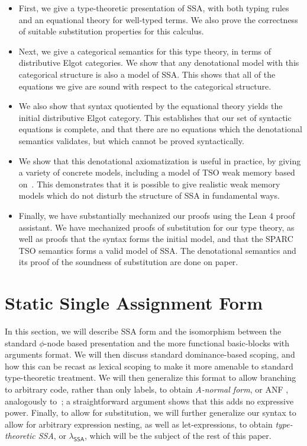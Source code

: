 \documentclass[acmsmall,screen,review]{acmart}
\newcommand{\ms}[1]{\ensuremath{\mathsf{#1}}}
\newcommand{\isotopessa}{\(\lambda_{\ms{SSA}}\)}
\begin{document}
\begin{itemize}
\item First, we give a type-theoretic presentation of SSA, with both typing rules and an equational
  theory for well-typed terms. We also prove the correctness of suitable substitution properties for
  this calculus. 
  
\item Next, we give a categorical semantics for this type theory, in terms of distributive Elgot
  categories. We show that any denotational model with this categorical structure is also a model of
  SSA. This shows that all of the equations we give are sound with respect to the categorical
  structure. 

\item We also show that syntax quotiented by the equational theory yields the initial distributive
  Elgot category. This establishes that our set of syntactic equations is complete, and that there
  are no equations which the denotational semantics validates, but which cannot be proved
  syntactically. 

\item We show that this denotational axiomatization is useful in practice, by giving a variety of
  concrete models, including a model of TSO weak memory based on~\cite{sparky}. This demonstrates
  that it is possible to give realistic weak memory models which do not disturb the structure of SSA
  in fundamental ways.

\item Finally, we have substantially mechanized our proofs using the Lean 4 proof assistant. We have
  mechanized proofs of substitution for our type theory, as well as proofs that the syntax forms the
  initial model, and that the SPARC TSO semantics forms a valid model of SSA. The denotational
  semantics and its proof of the soundness of substitution are done on paper. 

\end{itemize}

\section{Static Single Assignment Form}

In this section, we will describe SSA form and the isomorphism between the standard $\phi$-node
based presentation and the more functional basic-blocks with arguments format. We will then discuss
standard dominance-based scoping, and how this can be recast as lexical scoping to make it more
amenable to standard type-theoretic treatment. We will then generalize this format to allow
branching to arbitrary code, rather than only labels, to obtain \textit{A-normal form}, or ANF
\cite{flanagan-93-anf}, analogously to~\citet{chakravarty-functional-ssa-2003}; a straightforward
argument shows that this adds no expressive power. Finally, to allow for substitution, we will
further generalize our syntax to allow for arbitrary expression nesting, as well as let-expressions,
to obtain \textit{type-theoretic SSA}, or \isotopessa, which will be the subject of the rest of this
paper.
\end{document}
